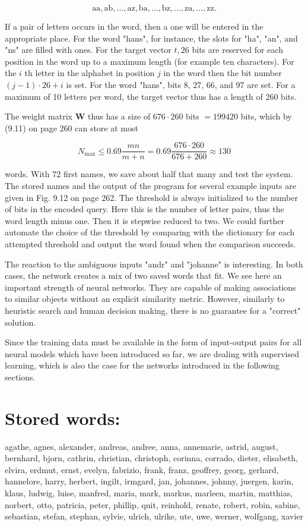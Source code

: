 \documentclass[10pt]{book}
\begin{document}
$$
\mathrm{aa}, \mathrm{ab}, \ldots, \mathrm{az}, \mathrm{ba}, \ldots, \mathrm{bz}, \ldots, \mathrm{za}, \ldots, \mathrm{zz} .
$$

If a pair of letters occurs in the word, then a one will be entered in the appropriate place. For the word "hans", for instance, the slots for "ha", "an", and "ns" are filled with ones. For the target vector $t, 26$ bits are reserved for each position in the word up to a maximum length (for example ten characters). For the $i$ th letter in the alphabet in position $j$ in the word then the bit number $(j-1) \cdot 26+i$ is set. For the word "hans", bits 8, 27, 66, and 97 are set. For a maximum of 10 letters per word, the target vector thus has a length of 260 bits.

The weight matrix $\boldsymbol{W}$ thus has a size of $676 \cdot 260$ bits $=199420$ bits, which by (9.11) on page 260 can store at most

$$
N_{\max } \leq 0.69 \frac{m n}{m+n}=0.69 \frac{676 \cdot 260}{676+260} \approx 130
$$

words. With 72 first names, we save about half that many and test the system. The stored names and the output of the program for several example inputs are given in Fig. 9.12 on page 262. The threshold is always initialized to the number of bits in the encoded query. Here this is the number of letter pairs, thus the word length minus one. Then it is stepwise reduced to two. We could further automate the choice of the threshold by comparing with the dictionary for each attempted threshold and output the word found when the comparison succeeds.

The reaction to the ambiguous inputs "andr" and "johanne" is interesting. In both cases, the network creates a mix of two saved words that fit. We see here an important strength of neural networks. They are capable of making associations to similar objects without an explicit similarity metric. However, similarly to heuristic search and human decision making, there is no guarantee for a "correct" solution.

Since the training data must be available in the form of input-output pairs for all neural models which have been introduced so far, we are dealing with supervised learning, which is also the case for the networks introduced in the following sections.

\section{Stored words:}
agathe, agnes, alexander, andreas, andree, anna, annemarie, astrid, august, bernhard, bjorn, cathrin, christian, christoph, corinna, corrado, dieter, elisabeth, elvira, erdmut, ernst, evelyn, fabrizio, frank, franz, geoffrey, georg, gerhard, hannelore, harry, herbert, ingilt, irmgard, jan, johannes, johnny, juergen, karin, klaus, ludwig, luise, manfred, maria, mark, markus, marleen, martin, matthias, norbert, otto, patricia, peter, phillip, quit, reinhold, renate, robert, robin, sabine, sebastian, stefan, stephan, sylvie, ulrich, ulrike, ute, uwe, werner, wolfgang, xavier
\end{document}
